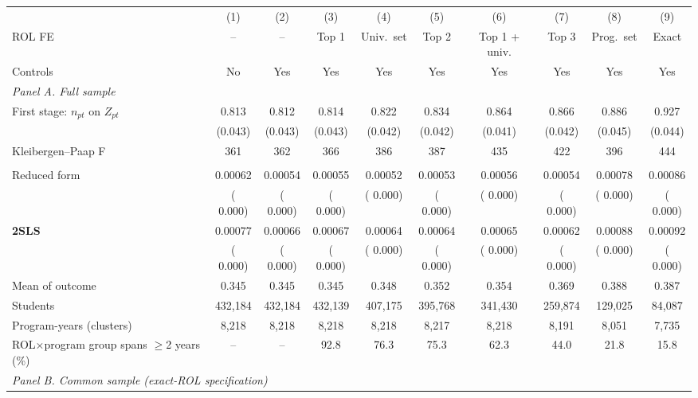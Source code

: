 \begin{tabular}{l*{9}{c}}
\toprule
  & (1) & (2) & (3) & (4) & (5) & (6) & (7) & (8) & (9) \\
ROL FE & -- & -- & Top 1 & Univ.\ set & Top 2 & Top 1 + univ. & Top 3 & Prog.\ set & Exact \\
Controls & No & Yes & Yes & Yes & Yes & Yes & Yes & Yes & Yes \\
\midrule
\multicolumn{10}{l}{\textit{Panel A. Full sample}} \\
First stage: \(n_{pt}\) on \(Z_{pt}\) &  0.813\sym{***} &  0.812\sym{***} &  0.814\sym{***} &  0.822\sym{***} &  0.834\sym{***} &  0.864\sym{***} &  0.866\sym{***} &  0.886\sym{***} &  0.927\sym{***} \\
 & (0.043) & (0.043) & (0.043) & (0.042) & (0.042) & (0.041) & (0.042) & (0.045) & (0.044) \\
Kleibergen--Paap F &    361 &    362 &    366 &    386 &    387 &    435 &    422 &    396 &    444 \\
\addlinespace
\multicolumn{10}{l}{Graduation from the enrolled program, 8y} \\
\quad Reduced form &  0.00062\sym{***} &  0.00054\sym{**} &  0.00055\sym{**} &  0.00052\sym{**} &  0.00053\sym{**} &  0.00056\sym{**} &  0.00054\sym{*} &  0.00078\sym{**} &  0.00086\sym{**} \\
 & ( 0.000) & ( 0.000) & ( 0.000) & ( 0.000) & ( 0.000) & ( 0.000) & ( 0.000) & ( 0.000) & ( 0.000) \\
\quad \textbf{2SLS} &  0.00077\sym{***} &  0.00066\sym{**} &  0.00067\sym{**} &  0.00064\sym{**} &  0.00064\sym{**} &  0.00065\sym{**} &  0.00062\sym{*} &  0.00088\sym{**} &  0.00092\sym{**} \\
 & ( 0.000) & ( 0.000) & ( 0.000) & ( 0.000) & ( 0.000) & ( 0.000) & ( 0.000) & ( 0.000) & ( 0.000) \\
Mean of outcome & 0.345 & 0.345 & 0.345 & 0.348 & 0.352 & 0.354 & 0.369 & 0.388 & 0.387 \\
Students &   432,184 &   432,184 &   432,139 &   407,175 &   395,768 &   341,430 &   259,874 &   129,025 &    84,087 \\
Program-years (clusters) &  8,218 &  8,218 &  8,218 &  8,218 &  8,217 &  8,218 &  8,191 &  8,051 &  7,735 \\
ROL\(\times\)program group spans \(\geq\)2 years (\%) & -- & -- &  92.8 &  76.3 &  75.3 &  62.3 &  44.0 &  21.8 &  15.8 \\
\midrule
\multicolumn{10}{l}{\textit{Panel B. Common sample (exact-ROL specification)}} \\

\end{tabular}
